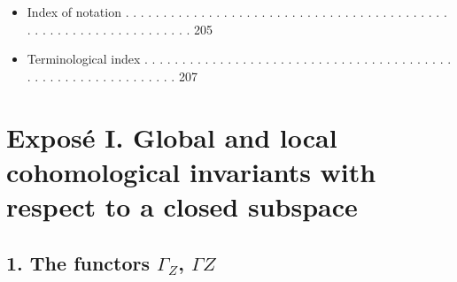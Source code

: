 \documentclass[
]{article}
\providecommand{\tightlist}{%
  \setlength{\itemsep}{0pt}\setlength{\parskip}{0pt}}
\begin{document}
\begin{itemize}
  \begin{enumerate}
  \def\labelenumi{\arabic{enumi}.}
  \tightlist
  \item
    Cohomological and homotopical depth . . . . . . . . . . . . . . . .
    . . . . . . . . . . . . . . . . . . . . . . . . 159
  \item
    Technical lemmas . . . . . . . . . . . . . . . . . . . . . . . . . .
    . . . . . . . . . . . . . . . . . . . . . . . . . . . . . . . . .
    177
  \item
    Converse of the affine Lefschetz theorem . . . . . . . . . . . . . .
    . . . . . . . . . . . . . . . . . . . . . . . . . 181
  \item
    Main theorem and variants . . . . . . . . . . . . . . . . . . . . .
    . . . . . . . . . . . . . . . . . . . . . . . . . . . . . 187
  \item
    Geometrical depth . . . . . . . . . . . . . . . . . . . . . . . . .
    . . . . . . . . . . . . . . . . . . . . . . . . . . . . . . . . .
    198
  \item
    Open questions . . . . . . . . . . . . . . . . . . . . . . . . . . .
    . . . . . . . . . . . . . . . . . . . . . . . . . . . . . . . . .
    202
  \item
    Bibliography . . . . . . . . . . . . . . . . . . . . . . . . . . . .
    . . . . . . . . . . . . . . . . . . . . . . . . . . . . . . . . . .
    204
  \end{enumerate}
\item
  Index of notation . . . . . . . . . . . . . . . . . . . . . . . . . .
  . . . . . . . . . . . . . . . . . . . . . . . . . . . . . . . . . . .
  . . . . 205
\item
  Terminological index . . . . . . . . . . . . . . . . . . . . . . . . .
  . . . . . . . . . . . . . . . . . . . . . . . . . . . . . . . . . . .
  . 207
\end{itemize}

\section{Exposé I. Global and local cohomological invariants with
respect to a closed
subspace}\label{exposuxe9-i.-global-and-local-cohomological-invariants-with-respect-to-a-closed-subspace}

\subsection{\texorpdfstring{1. The functors \(\Gamma_{Z}\),
\(\Gamma Z\)}{1. The functors \textbackslash Gamma\_\{Z\}, \textbackslash Gamma Z}}\label{the-functors-gamma_z-gamma-z}
\end{document}

